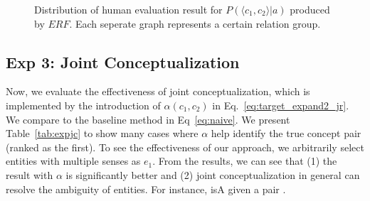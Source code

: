 %




%

\begin{figure*}[htb]
\vspace{-12mm}
\centering
{}
\vspace{-8mm}
\caption{Distribution of human evaluation result for $P(\langle c_1,c_2 \rangle|a)$ produced by $ERF$. \small Each seperate graph represents a certain relation group.}
\label{fig:eva_violin_group}
\vspace{-10mm}
\end{figure*}


\subsection{Exp 3: Joint Conceptualization}
Now, we evaluate the effectiveness of joint conceptualization, which is implemented by the introduction of $\alpha(c_1,c_2)$ in Eq.~\ref{eq:target_expand2_jr}. 
We compare to the baseline method in Eq~\ref{eq:naive}.
We present Table~\ref{tab:expjc} to show many cases where $\alpha$ help identify the true concept pair (ranked as the first).
To see the effectiveness of our approach, we arbitrarily select entities with multiple senses as $e_1$. 
From the results, we can see that (1) the result with $\alpha$ is significantly better and (2) joint conceptualization in general can resolve the ambiguity of entities. For instance,  isA  given a pair .




